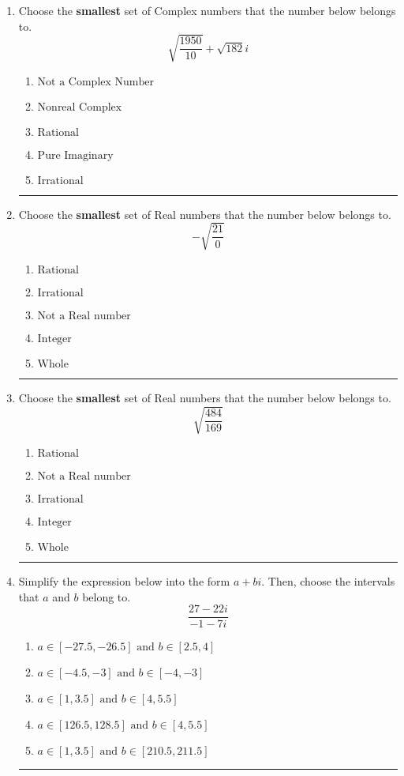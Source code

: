 \documentclass[14pt]{extbook}
\newcommand{\litem}[1]{\item#1\hspace*{-1cm}\rule{\textwidth}{0.4pt}}
\begin{document}
\begin{enumerate}
\litem{
Choose the \textbf{smallest} set of Complex numbers that the number below belongs to.\[ \sqrt{\frac{1950}{10}}+\sqrt{182} i \]\begin{enumerate}[label=\Alph*.]
\item \( \text{Not a Complex Number} \)
\item \( \text{Nonreal Complex} \)
\item \( \text{Rational} \)
\item \( \text{Pure Imaginary} \)
\item \( \text{Irrational} \)

\end{enumerate} }
\litem{
Choose the \textbf{smallest} set of Real numbers that the number below belongs to.\[ -\sqrt{\frac{21}{0}} \]\begin{enumerate}[label=\Alph*.]
\item \( \text{Rational} \)
\item \( \text{Irrational} \)
\item \( \text{Not a Real number} \)
\item \( \text{Integer} \)
\item \( \text{Whole} \)

\end{enumerate} }
\litem{
Choose the \textbf{smallest} set of Real numbers that the number below belongs to.\[ \sqrt{\frac{484}{169}} \]\begin{enumerate}[label=\Alph*.]
\item \( \text{Rational} \)
\item \( \text{Not a Real number} \)
\item \( \text{Irrational} \)
\item \( \text{Integer} \)
\item \( \text{Whole} \)

\end{enumerate} }
\litem{
Simplify the expression below into the form $a+bi$. Then, choose the intervals that $a$ and $b$ belong to.\[ \frac{27 - 22 i}{-1 - 7 i} \]\begin{enumerate}[label=\Alph*.]
\item \( a \in [-27.5, -26.5] \text{ and } b \in [2.5, 4] \)
\item \( a \in [-4.5, -3] \text{ and } b \in [-4, -3] \)
\item \( a \in [1, 3.5] \text{ and } b \in [4, 5.5] \)
\item \( a \in [126.5, 128.5] \text{ and } b \in [4, 5.5] \)
\item \( a \in [1, 3.5] \text{ and } b \in [210.5, 211.5] \)


\end{enumerate}}
\end{enumerate}
\end{document}
